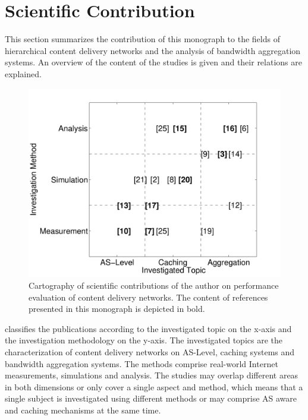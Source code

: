 \newpage
\section{Scientific Contribution}\label{sec:introduction:scientific_contribution}

This section summarizes the contribution of this monograph to the fields of hierarchical content delivery networks and the analysis of bandwidth aggregation systems.
An overview of the content of the studies is given and their relations are explained.

\begin{figure}
\centering
\includegraphics[width=\textwidth]{figures/publications}
\caption{Cartography of scientific contributions of the author on performance evaluation of content delivery networks. The content of references presented in this monograph is depicted in bold.}\label{fig:introduction:publications}
\end{figure}

 classifies the publications according to the investigated topic on the x-axis and the investigation methodology on the y-axis.
The investigated topics are the characterization of content delivery networks on AS-Level, caching systems and bandwidth aggregation systems.
The methods comprise real-world Internet measurements, simulations and analysis.
The studies may overlap different areas in both dimensions or only cover a single aspect and method, which means that a single subject is investigated using different methods or may comprise AS aware and caching mechanisms at the same time.

